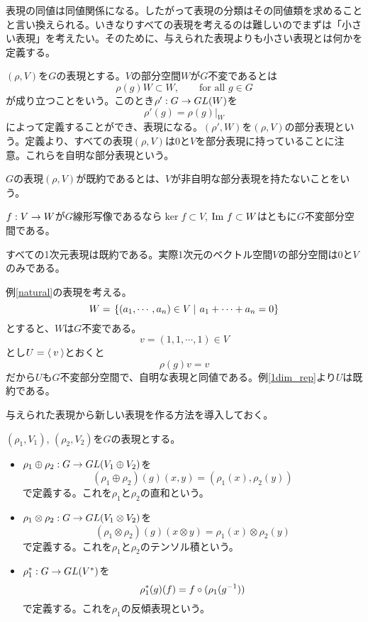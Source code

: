 \documentclass{ltjsarticle}
\begin{document}
表現の同値は同値関係になる。したがって表現の分類はその同値類を求めることと言い換えられる。いきなりすべての表現を考えるのは難しいのでまずは「小さい表現」を考えたい。そのために、与えられた表現よりも小さい表現とは何かを定義する。

\begin{defin}
  $(\rho,V)$を$G$の表現とする。$V$の部分空間$W$が$G$不変であるとは
  \[
  \rho(g)W\subset W,\qquad \text{for all $g\in G$}  
  \]
  が成り立つことをいう。このとき$\rho':G\rightarrow GL(W)$を
  \[
  \rho'(g)=\rho(g)|_W  
  \]
  によって定義することができ、表現になる。$(\rho',W)$を$(\rho, V)$の部分表現という。定義より、すべての表現$(\rho, V)$は$0$と$V$を部分表現に持っていることに注意。これらを自明な部分表現という。
\end{defin}

\begin{defin}
  $G$の表現$(\rho, V)$が既約であるとは、$V$が非自明な部分表現を持たないことをいう。
\end{defin}

\begin{eg}\label{ker_im}
  $f:V\rightarrow W$が$G$線形写像であるなら$\ker f\subset V$, $\text{Im } f\subset W$はともに$G$不変部分空間である。
\end{eg}

\begin{eg}\label{1dim_rep}
  すべての1次元表現は既約である。実際1次元のベクトル空間$V$の部分空間は$0$と$V$のみである。
\end{eg}

\begin{eg}
  例\ref{natural}の表現を考える。
  \[
  W=\left.\left\{(a_1,\cdots,a_n)\in V \: \right| \: a_1+\cdots+a_n=0\right\}  
  \]
  とすると、$W$は$G$不変である。
  \[
  v=(1,1,\cdots,1)\in V  
  \]
  とし$U=\langle\:v\:\rangle$とおくと
  \[
  \rho(g)v=v  
  \]
  だから$U$も$G$不変部分空間で、自明な表現と同値である。例\ref{1dim_rep}より$U$は既約である。
\end{eg}

与えられた表現から新しい表現を作る方法を導入しておく。
\begin{defin}
  $(\rho_1,V_1)$, $(\rho_2,V_2)$を$G$の表現とする。
  \begin{itemize}
    \item $\rho_1\oplus\rho_2:G\rightarrow GL(V_1\oplus V_2)$を
    \[
    (\rho_1\oplus\rho_2)(g)(x,y)=(\rho_1(x),\rho_2(y))
    \]
    で定義する。これを$\rho_1$と$\rho_2$の直和という。

    \item $\rho_1\otimes\rho_2:G\rightarrow GL(V_1\otimes V_2)$を
    \[
    (\rho_1\otimes\rho_2)(g)(x\otimes y)=\rho_1(x)\otimes\rho_2(y)
    \]
    で定義する。これを$\rho_1$と$\rho_2$のテンソル積という。

    \item $\rho_1^*:G\rightarrow GL(V^*)$を
    \[
    \rho_1^*(g)(f)=f\circ (\rho_1(g^{-1}))
    \]
    で定義する。これを$\rho_1$の反傾表現という。
  \end{itemize}
\end{defin}
\end{document}

